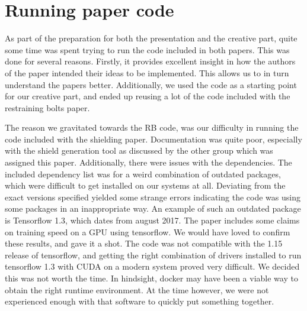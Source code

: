\documentclass[letterpaper]{article}
\begin{document}
\section{Running paper code} %
As part of the preparation for both the presentation and the creative part, quite some time was spent trying to run the code included in both papers. This was done for several reasons. Firstly, it provides excellent insight in how the authors of the paper intended their ideas to be implemented. This allows us to in turn understand the papers better. Additionally, we used the code as a starting point for our creative part, and ended up reusing a lot of the code included with the restraining bolts paper.
\par The reason we gravitated towards the RB code, was our difficulty in running the code included with the shielding paper. Documentation was quite poor, especially with the shield generation tool as discussed by the other group which was assigned this paper. Additionally, there were issues with the dependencies. The included dependency list was for a weird combination of outdated packages, which were difficult to get installed on our systems at all. Deviating from the exact versions specified yielded some strange errors indicating the code was using some packages in an inappropriate way. An example of such an outdated package is Tensorflow 1.3, which dates from august 2017. The paper includes some claims on training speed on a GPU using tensorflow. We would have loved to confirm these results, and gave it a shot. The code was not compatible with the 1.15 release of tensorflow, and getting the right combination of drivers installed to run tensorflow 1.3 with CUDA on a modern system proved very difficult. We decided this was not worth the time. In hindsight, docker may have been a viable way to obtain the right runtime environment. At the time however, we were not experienced enough with that software to quickly put something together.
\end{document}

